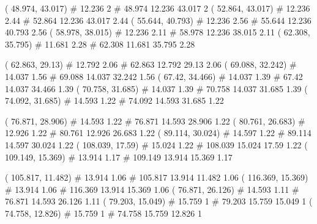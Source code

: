 \documentclass[a4paper,openbib,10pt]{article}
\newenvironment{treegraph}{\begin{graph}}{\end{graph}}
\begin{document}
\begin{treegraph}
  ( 48.974, 43.017) #     12.236    2
   #    48.974    12.236    43.017    2
  ( 52.864, 43.017) #     12.236    2.44
   #    52.864    12.236    43.017    2.44
  ( 55.644, 40.793) #     12.236    2.56
   #    55.644    12.236    40.793    2.56
  ( 58.978, 38.015) #     12.236    2.11
   #    58.978    12.236    38.015    2.11
  ( 62.308, 35.795) #     11.681    2.28
   #    62.308    11.681    35.795    2.28

  ( 62.863, 29.13) #     12.792    2.06
   #    62.863    12.792    29.13    2.06
  ( 69.088, 32.242) #     14.037    1.56
   #    69.088    14.037    32.242    1.56
  ( 67.42, 34.466) #     14.037    1.39
   #    67.42    14.037    34.466    1.39
  ( 70.758, 31.685) #     14.037    1.39
   #    70.758    14.037    31.685    1.39
  ( 74.092, 31.685) #     14.593    1.22
   #    74.092    14.593    31.685    1.22

  ( 76.871, 28.906) #     14.593    1.22
   #    76.871    14.593    28.906    1.22
  ( 80.761, 26.683) #     12.926    1.22
   #    80.761    12.926    26.683    1.22
  ( 89.114, 30.024) #     14.597    1.22
   #    89.114    14.597    30.024    1.22
  ( 108.039, 17.59) #     15.024    1.22
   #    108.039    15.024    17.59    1.22
  ( 109.149, 15.369) #     13.914    1.17
   #    109.149    13.914    15.369    1.17

  ( 105.817, 11.482) #     13.914    1.06
   #    105.817    13.914    11.482    1.06
  ( 116.369, 15.369) #     13.914    1.06
   #    116.369    13.914    15.369    1.06
  ( 76.871, 26.126) #     14.593    1.11
   #    76.871    14.593    26.126    1.11
  ( 79.203, 15.049) #     15.759    1
   #    79.203    15.759    15.049    1
  ( 74.758, 12.826) #     15.759    1
   #    74.758    15.759    12.826    1


\end{treegraph}
\end{document}
